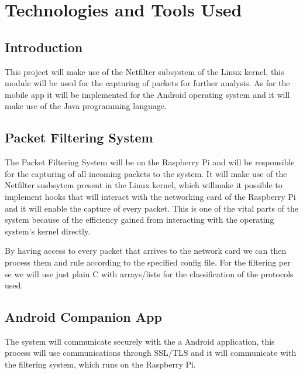 \chapter{Technologies and Tools Used}
\label{chap:tech}

\section{Introduction}
\label{chap3:sec:intro}
This project will make use of the Netfilter subsystem of the Linux kernel, this
module will be used for the capturing of packets for further analysis. As for
the mobile app it will be implemented for the Android operating system and it
will make use of the Java programming language.

\section{Packet Filtering System}
\label{chap3:sec:pfs}
The Packet Filtering System will be on the Raspberry Pi and will be responsible
for the capturing of all incoming packets to the system. It will make use of
the Netfilter susbsytem present in the Linux kernel, which willmake it possible
to implement hooks that will interact with the networking card of the Raspberry
Pi and it will enable the capture of every packet. This is one of the vital
parts of the system because of the efficiency gained from interacting with the
operating system's kernel directly.

By having access to every packet that arrives to the network card we can then
process them and rule according to the specified config file. For the filtering
per se we will use just plain C with arrays/lists  for the classification of
the protocols used.

\section{Android Companion App}
\label{chap3:sec:aca}
The system will communicate securely with the a Android application, this
process will use communications through SSL/TLS and it will communicate with
the filtering system, which runs on the Raspberry Pi.

